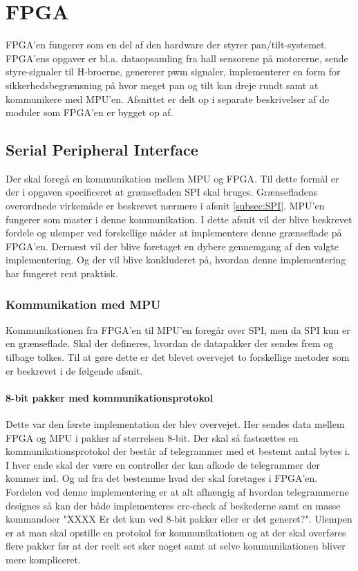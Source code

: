 \section{FPGA}
FPGA'en fungerer som en del af den hardware der styrer pan/tilt-systemet. FPGA'ens opgaver er bl.a. dataopsamling fra hall sensorene på motorerne, sende styre-signaler til H-broerne, genererer pwm signaler, implementerer en form for sikkerhedsbegrænsning på hvor meget pan og tilt kan dreje rundt samt at kommunikere med MPU'en. Afsnittet er delt op i separate beskrivelser af de moduler som FPGA'en er bygget op af. \\

\subsection{Serial Peripheral Interface}
Der skal foregå en kommunikation mellem MPU og FPGA. Til dette formål er der i opgaven specificeret at grænsefladen SPI skal bruges. Grænsefladens overordnede virkemåde er beskrevet nærmere i afsnit \ref{subsec:SPI}. MPU'en fungerer som master i denne kommunikation. I dette afsnit vil der blive beskrevet fordele og ulemper ved forskellige måder at implementere denne grænseflade på FPGA'en. Dernæst vil der blive foretaget en dybere gennemgang af den valgte implementering. Og der vil blive konkluderet på, hvordan denne implementering har fungeret rent praktisk.

\subsubsection{Kommunikation med MPU}
Kommunikationen fra FPGA'en til MPU'en foregår over SPI, men da SPI kun er en grænseflade. Skal der defineres, hvordan de datapakker der sendes frem og tilbage tolkes. Til at gøre dette er det blevet overvejet to forskellige metoder som er beskrevet i de følgende afsnit.

\paragraph*{8-bit pakker med kommunikationsprotokol}
Dette var den første implementation der blev overvejet. Her sendes data mellem FPGA og MPU i pakker af størrelsen 8-bit. Der skal så fastsættes en kommunikationsprotokol der består af telegrammer med et bestemt antal bytes i.\\
I hver ende skal der være en controller der kan afkode de telegrammer der kommer ind. Og ud fra det bestemme hvad der skal foretages i FPGA'en. Fordelen ved denne implementering er at alt afhængig af hvordan telegrammerne designes så kan der både implementeres crc-check af beskederne samt en masse kommandoer "XXXX Er det kun ved 8-bit pakker eller er det generet?". Ulempen er at man skal opstille en protokol for kommunikationen og at der skal overføres flere pakker før at der reelt set sker noget samt at selve kommunikationen bliver mere kompliceret.

